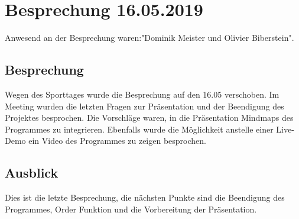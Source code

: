 \documentclass[a4paper,parskip]{scrartcl}
\begin{document}
\section{Besprechung 16.05.2019}
Anwesend an der Besprechung waren:"Dominik Meister und Olivier Biberstein". 
\subsection{Besprechung}
Wegen des Sporttages wurde die Besprechung auf den 16.05 verschoben. Im Meeting wurden die letzten Fragen zur Präsentation und der Beendigung des Projektes besprochen. Die Vorschläge waren, in die Präsentation Mindmaps des Programmes zu integrieren. Ebenfalls wurde die Möglichkeit anstelle einer Live-Demo ein Video des Programmes zu zeigen besprochen.
\subsection{Ausblick}
Dies ist die letzte Besprechung, die nächsten Punkte sind die Beendigung des Programmes, Order Funktion und die Vorbereitung der Präsentation. 
\end{document}
